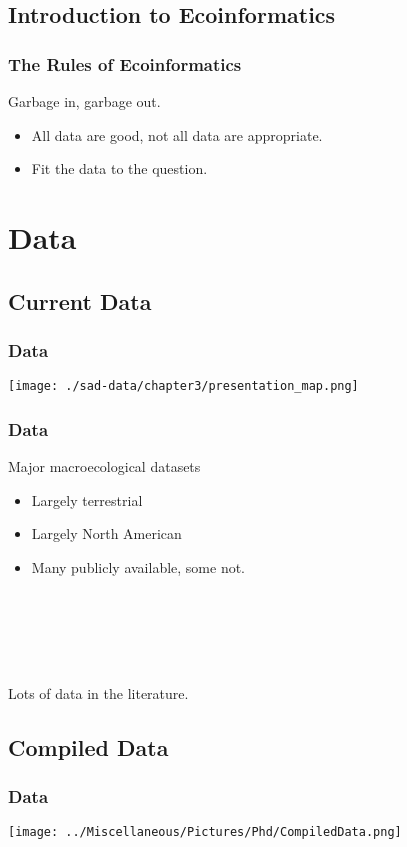 \documentclass[14pt]{beamer}
\begin{document}
\subsection{Introduction to Ecoinformatics}
\begin{frame}[t]
\frametitle{The Rules of Ecoinformatics}
\begin{Large}
Garbage in, garbage out.\\
\end{Large}
\begin{itemize}
\item All data are good, not all data are appropriate.
\item Fit the data to the question.
\end{itemize}
\end{frame}



\section{Data}
\subsection{Current Data}
\begin{frame}[t]
\frametitle{Data}
\vspace{-7pt}
\texttt{[image: ./sad-data/chapter3/presentation\_map.png]}
\end{frame}

\begin{frame}[t]{}
\frametitle{Data}
\begin{large}
Major macroecological datasets\\
\end{large}
\begin{itemize}
\item Largely terrestrial
\item Largely North American
\item Many publicly available, some not.
\end{itemize}
~\\
~\\
~\\
~\\
\begin{large}
Lots of data in the literature.\\
\end{large}
\end{frame}


\subsection{Compiled Data}
\begin{frame}{}
\frametitle{Data}
\texttt{[image: ../Miscellaneous/Pictures/Phd/CompiledData.png]}
\end{frame}
\end{document}
